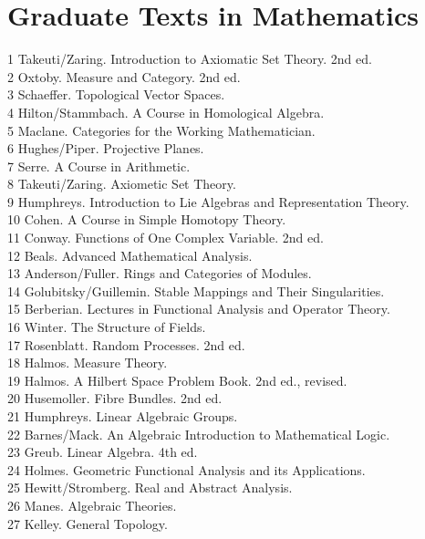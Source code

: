 \documentclass[10pt]{article}
\begin{document}
\section*{Graduate Texts in Mathematics}
1 Takeuti/Zaring. Introduction to Axiomatic Set Theory. 2nd ed.\\
2 Oxtoby. Measure and Category. 2nd ed.\\
3 Schaeffer. Topological Vector Spaces.\\
4 Hilton/Stammbach. A Course in Homological Algebra.\\
5 Maclane. Categories for the Working Mathematician.\\
6 Hughes/Piper. Projective Planes.\\
7 Serre. A Course in Arithmetic.\\
8 Takeuti/Zaring. Axiometic Set Theory.\\
9 Humphreys. Introduction to Lie Algebras and Representation Theory.\\
10 Cohen. A Course in Simple Homotopy Theory.\\
11 Conway. Functions of One Complex Variable. 2nd ed.\\
12 Beals. Advanced Mathematical Analysis.\\
13 Anderson/Fuller. Rings and Categories of Modules.\\
14 Golubitsky/Guillemin. Stable Mappings and Their Singularities.\\
15 Berberian. Lectures in Functional Analysis and Operator Theory.\\
16 Winter. The Structure of Fields.\\
17 Rosenblatt. Random Processes. 2nd ed.\\
18 Halmos. Measure Theory.\\
19 Halmos. A Hilbert Space Problem Book. 2nd ed., revised.\\
20 Husemoller. Fibre Bundles. 2nd ed.\\
21 Humphreys. Linear Algebraic Groups.\\
22 Barnes/Mack. An Algebraic Introduction to Mathematical Logic.\\
23 Greub. Linear Algebra. 4th ed.\\
24 Holmes. Geometric Functional Analysis and its Applications.\\
25 Hewitt/Stromberg. Real and Abstract Analysis.\\
26 Manes. Algebraic Theories.\\
27 Kelley. General Topology.\\
\end{document}
